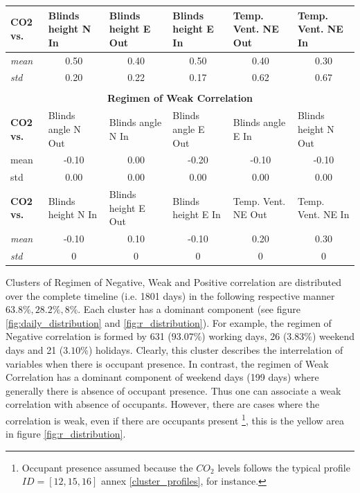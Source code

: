 \begin{table}[htbp]
\begin{tabular}{|l|c|c|c|c|c|}
    \hline
    \textbf{CO2 vs.} & \multicolumn{1}{l|}{\textbf{Blinds height N In}} & \multicolumn{1}{l|}{\textbf{ Blinds height E Out}} & \multicolumn{1}{l|}{\textbf{Blinds height E In}} & \multicolumn{1}{l|}{\textbf{Temp. Vent. NE Out}} & \multicolumn{1}{l|}{\textbf{Temp. Vent. NE In}} \bigstrut\\
    \hline
    \textit{mean} & 0.50 & 0.40 & 0.50 & 0.40 & 0.30 \bigstrut\\
    \hline
    \textit{std} & 0.20 & 0.22 & 0.17 & 0.62 & 0.67 \bigstrut\\
    \hline
    \multicolumn{1}{l}{} & \multicolumn{1}{c}{} & \multicolumn{1}{c}{} & \multicolumn{1}{c}{} & \multicolumn{1}{c}{} & \multicolumn{1}{c}{} \bigstrut[t]\\
    \multicolumn{6}{c}{\textcolor[rgb]{ .31,  .506,  .741}{\textbf{Regimen of Weak Correlation}}} \bigstrut[b]\\
    \hline
    \textbf{CO2 vs.} & \multicolumn{1}{l|}{Blinds angle N Out} & \multicolumn{1}{l|}{ Blinds angle N In} & \multicolumn{1}{l|}{ Blinds angle E Out} & \multicolumn{1}{l|}{Blinds angle E In} & \multicolumn{1}{l|}{Blinds height N Out} \bigstrut\\
    \hline
    mean & -0.10 & 0.00 & -0.20 & -0.10 & -0.10 \bigstrut\\
    \hline
    std & 0.00 & 0.00 & 0.00 & 0.00 & 0.00 \bigstrut\\
    \hline
    \textbf{CO2 vs.} & \multicolumn{1}{l|}{Blinds height N In} & \multicolumn{1}{l|}{ Blinds height E Out} & \multicolumn{1}{l|}{Blinds height E In} & \multicolumn{1}{l|}{Temp. Vent. NE Out} & \multicolumn{1}{l|}{Temp. Vent. NE In} \bigstrut\\
    \hline
    \textit{mean} & -0.10 & 0.10 & -0.10 & 0.20 & 0.30 \bigstrut\\
    \hline
    \textit{std} & 0    & 0    & 0    & 0    & 0 \bigstrut\\
    \hline
    \end{tabular}%
  \label{tab:regimen_centers}%
\end{table}%

Clusters of Regimen of Negative, Weak and Positive correlation are distributed over the complete timeline (i.e. 1801 days) in the following respective manner $63.8\%, 28.2\%, 8\%$. Each cluster has a dominant component (see figure \ref{fig:daily_distribution} and \ref{fig:r_distribution}). For example, the regimen of Negative correlation is formed by 631 ($93.07\%$) working days, 26 ($3.83\%$) weekend days and 21 ($3.10\%$) holidays. Clearly, this cluster describes the interrelation of variables when there is occupant presence. In contrast, the regimen of Weak Correlation has a dominant component of weekend days (199 days) where generally there is absence of occupant presence. Thus one can associate a weak correlation with absence of occupants. However, there are cases where the correlation is weak, even if there are occupants present \footnote{Occupant presence assumed because the $CO_2$ levels follows the typical profile $ ID=[12, 15, 16] $ annex \ref{cluster_profiles}, for instance.}, this is the yellow area in figure \ref{fig:r_distribution}. \\

